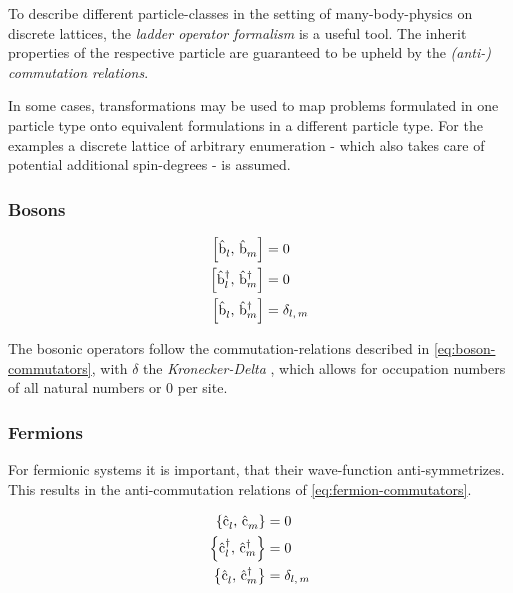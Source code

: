To describe different particle-classes in the setting of many-body-physics on discrete lattices, the \emph{ladder operator formalism} is a useful tool. 
The inherit properties of the respective particle are guaranteed to be upheld by the \emph{(anti-) commutation relations}.

In some cases, transformations may be used to map problems formulated in one particle type onto equivalent formulations in a different particle type.
For the examples a discrete lattice of arbitrary enumeration - which also takes care of potential additional spin-degrees - is assumed.

\subsubsection*{Bosons}

\begin{equation}
    \label{eq:boson-commutators}
    \begin{split}
        \left[\hat{\text{b}}^{ }_{l},\,\hat{\text{b}}^{ }_{m}\right] &= 0\\
        \left[\hat{\text{b}}^{\dagger }_{l},\,\hat{\text{b}}^{\dagger }_{m}\right] &= 0\\
        \left[\hat{\text{b}}^{ }_{l},\,\hat{\text{b}}^{\dagger }_{m}\right] &= \delta_{l,\,m}\\
    \end{split}
\end{equation}

The bosonic operators follow the commutation-relations described in \autoref{eq:boson-commutators}, with $\delta$ the \emph{Kronecker-Delta} \cite{schwablBookII}, which allows for occupation numbers of all natural numbers or $0$ per site.

\subsubsection*{Fermions}

For fermionic systems it is important, that their wave-function anti-symmetrizes. This results in the anti-commutation relations of  \autoref{eq:fermion-commutators}.

\begin{equation}
    \label{eq:fermion-commutators}
    \begin{split}
        \left\{\hat{\text{c}}^{ }_{l},\,\hat{\text{c}}^{ }_{m}\right\} &= 0\\
        \left\{\hat{\text{c}}^{\dagger }_{l},\,\hat{\text{c}}^{\dagger }_{m}\right\} &= 0\\
        \left\{\hat{\text{c}}^{ }_{l},\,\hat{\text{c}}^{\dagger }_{m}\right\} &= \delta_{l,\,m}\\
    \end{split}
\end{equation}

